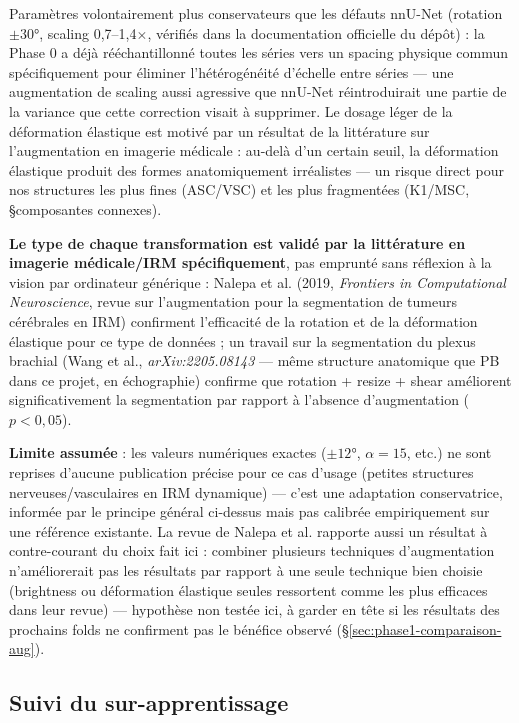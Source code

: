 Paramètres volontairement plus conservateurs que les défauts nnU-Net (rotation
$\pm30°$, scaling 0,7--1,4$\times$, vérifiés dans la documentation officielle du
dépôt) : la Phase 0 a déjà rééchantillonné toutes les séries vers un spacing physique
commun spécifiquement pour éliminer l'hétérogénéité d'échelle entre séries --- une
augmentation de scaling aussi agressive que nnU-Net réintroduirait une partie de la
variance que cette correction visait à supprimer. Le dosage léger de la déformation
élastique est motivé par un résultat de la littérature sur l'augmentation en imagerie
médicale : au-delà d'un certain seuil, la déformation élastique produit des formes
anatomiquement irréalistes --- un risque direct pour nos structures les plus fines
(ASC/VSC) et les plus fragmentées (K1/MSC, \S composantes connexes).

\textbf{Le type de chaque transformation est validé par la littérature en imagerie
médicale/IRM spécifiquement}, pas emprunté sans réflexion à la vision par ordinateur
générique : Nalepa et al. (2019, \emph{Frontiers in Computational Neuroscience},
revue sur l'augmentation pour la segmentation de tumeurs cérébrales en IRM) confirment
l'efficacité de la rotation et de la déformation élastique pour ce type de données ;
un travail sur la segmentation du plexus brachial (Wang et al., \emph{arXiv:2205.08143}
--- même structure anatomique que PB dans ce projet, en échographie) confirme que
rotation + resize + shear améliorent significativement la segmentation par rapport à
l'absence d'augmentation ($p<0{,}05$).

\textbf{Limite assumée} : les valeurs numériques exactes ($\pm12°$, $\alpha=15$,
etc.) ne sont reprises d'aucune publication précise pour ce cas d'usage (petites
structures nerveuses/vasculaires en IRM dynamique) --- c'est une adaptation
conservatrice, informée par le principe général ci-dessus mais pas calibrée
empiriquement sur une référence existante. La revue de Nalepa et al. rapporte aussi
un résultat à contre-courant du choix fait ici : combiner plusieurs techniques
d'augmentation n'améliorerait pas les résultats par rapport à une seule technique bien
choisie (brightness ou déformation élastique seules ressortent comme les plus
efficaces dans leur revue) --- hypothèse non testée ici, à garder en tête si les
résultats des prochains folds ne confirment pas le bénéfice observé
(\S\ref{sec:phase1-comparaison-aug}).

\subsection{Suivi du sur-apprentissage}

